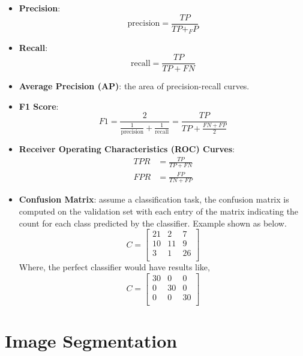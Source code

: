 \documentclass[a4paper]{article}
\begin{document}
\begin{itemize}
	\item \textbf{Precision}:
	\begin{equation}
		\text{precision} = \frac{TP}{TP +_ FP}
	\end{equation}
	\item \textbf{Recall}:
	\begin{equation}
		\text{recall} = \frac{TP}{TP + FN}
	\end{equation}
	\item \textbf{Average Precision (AP)}: the area of precision-recall curves.
	\item \textbf{F1 Score}:
	\begin{equation}
		F1 = \frac{2}{\frac{1}{\text{precision}} + \frac{1}{\text{recall}}} = \frac{TP}{TP + \frac{FN + FP}{2}}
	\end{equation}
	\item \textbf{Receiver Operating Characteristics (ROC) Curves}:
	\begin{align}
		TPR &= \frac{TP}{TP + FN} \\
		FPR &= \frac{FP}{TN + FP}
	\end{align}
	\item \textbf{Confusion Matrix}: assume a classification task, the confusion matrix is computed on the validation set with each entry of the matrix indicating the count for each class predicted by the classifier. Example shown as below.
	\begin{equation}
		C = 
		\begin{bmatrix}
			21 & 2 & 7 \\
			10 & 11 & 9 \\
			3 & 1 & 26 \\
		\end{bmatrix}
	\end{equation}
	Where, the perfect classifier would have results like,
	\begin{equation}
		C = 
		\begin{bmatrix}
			30 & 0 & 0 \\
			0 & 30 & 0 \\
			0 & 0 & 30 \\
		\end{bmatrix}
	\end{equation}
\end{itemize}

\section{Image Segmentation}
\end{document}

